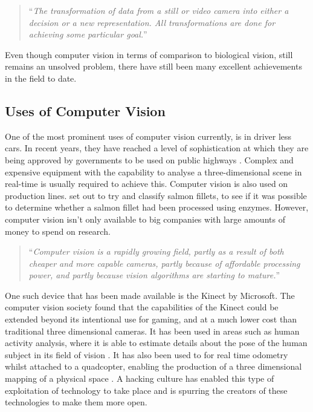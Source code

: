 \documentclass[11pt,oneside]{report}
\begin{document}
				\begin{quote}
					``\textit{The transformation of data from a still or video camera into either a decision or a new representation.
						All transformations are done for achieving some particular goal.}'' \cite[p. 2]{definition:cv}
				\end{quote}
				
				Even though computer vision in terms of comparison to biological vision, still remains an unsolved problem, there have still been many excellent achievements in the field to date.
			\subsection{Uses of Computer Vision}
				One of the most prominent uses of computer vision currently, is in driver less cars.
				In recent years, they have reached a level of sophistication at which they are being approved by governments to be used on public highways \cite{web:driverlessCars}.
				Complex and expensive equipment with the capability to analyse a three-dimensional scene in real-time is usually required to achieve this.
				Computer vision is also used on production lines.
				 set out to try and classify salmon fillets, to see if it was possible to determine whether a salmon fillet had been processed using enzymes. %
				However, computer vision isn't only available to big companies with large amounts of money to spend on research.
				\begin{quote}
				``\textit{Computer vision is a rapidly growing field, partly as a result of both cheaper and more capable cameras, partly because of affordable processing power, and partly because vision algorithms are starting to mature.}''\cite[p. ix]{definition:cv}
				\end{quote}
				One such device that has been made available is the Kinect by Microsoft.
				The computer vision society found that the capabilities of the Kinect could be extended beyond its intentional use for gaming, and at a much lower cost than traditional three dimensional cameras.
				It has been used in areas such as human activity analysis, where it is able to estimate details about the pose of the human subject in its field of vision \cite{kinect:1}.
				It has also been used to for real time odometry whilst attached to a quadcopter, enabling the production of a three dimensional mapping of a physical space \cite{kinect:2}.
				A hacking culture has enabled this type of exploitation of technology to take place and is spurring the creators of these technologies to make them more open.
				
\end{document}
